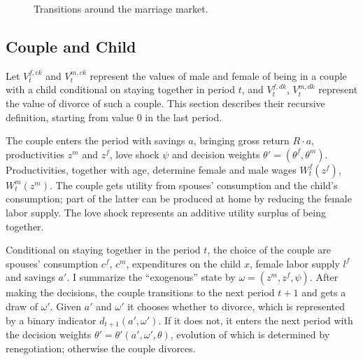 \documentclass[12pt,letter]{article}
\begin{document}
\begin{figure}
\begin{center}
\caption{Transitions around the marriage market.\label{diagram}}
\end{center}
\end{figure}

\subsection{Couple and Child}
Let $V^{f,ck}_t$ and $V^{m,ck}_t$ represent the values of male and female of being in a couple with a child conditional on staying together in period $t$, and $V^{f,dk}_t$, $V^{m,dk}_t$ represent the value of divorce of such a couple. This section describes their recursive definition, starting from value $0$ in the last period.

The couple enters the period with savings $a$, bringing gross return $R\cdot a$, productivities $z^m$ and $z^f$, love shock $\psi$ and decision weights $\theta' = (\theta^f,\theta^m)$. Productivities, together with age, determine female and male wages $W^f_t(z^f)$, $W^m_t(z^m)$. The couple gets utility from spouses' consumption and the child's consumption; part of the latter can be produced at home by reducing the female labor supply. The love shock represents an additive utility surplus of being together.

Conditional on staying together in the period $t$, the choice of the couple are spouses' consumption $c^f$, $c^m$, expenditures on the child $x$, female labor supply $l^f$ and savings $a'$. I summarize the ``exogenous'' state by $\omega = (z^m,z^f,\psi)$. After making the decisions, the couple transitions to the next period $t+1$ and gets a draw of $\omega'$. Given $a'$ and $\omega'$ it chooses whether to divorce, which is represented by a binary indicator $d_{t+1}(a',\omega')$.  If it does not, it enters the next period with the decision weights $\theta'=\theta'(a',\omega',\theta)$, evolution of which is determined by renegotiation; otherwise the couple divorces.
\end{document}
